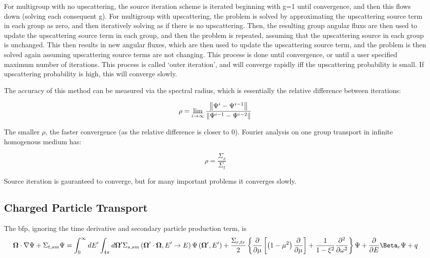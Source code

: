For multigroup with no upscattering, the source iteration scheme is iterated beginning with g=1 until convergence, and then this flows down (solving each consequent g). For multigroup with upscattering, the problem is solved by approximating the upscattering source term in each group as zero, and then iteratively solving as if there is no upscattering. Then, the resulting group angular fluxs are then used to update the upscattering source term in each group, and then the problem is repeated, assuming that the upscattering source in each group is unchanged. This then results in new angular fluxes, which are then used to update the upscattering source term, and the problem is then solved again assuming upscattering source terms are not changing. This process is done until convergence, or until a user specified maximum number of iterations. This process is called `outer iteration', and will converge rapidly iff the upscattering probability is small. If upscattering probability is high, this will converge slowly. 

The accuracy of this method can be measured via the spectral radius, which is essentially the relative difference between iterations:

\begin{equation}
    \rho = \lim_{i\rightarrow\infty}\frac{\left\lVert\Psi^i - \Psi^{i-1}\right\rVert}{\left\lVert\Psi^{i-1} - \Psi^{i-2}\right\rVert}
\end{equation}

The smaller $\rho$, the faster convergence (as the relative difference is closer to 0). Fourier analysis on one group transport in infinite homogenous medium has:

\begin{equation}
    \rho = \frac{\Sigma_s}{\Sigma_t}
\end{equation}

Source iteration is gauranteed to converge, but for many important problems it converges slowly. 

\subsection{Charged Particle Transport}
The \gls{bfp}, ignoring the time derivative and secondary particle production term, is 
\begin{equation}
    \solidangle\cdot\nabla\angularflux + \macroxs{t,sm}\angularflux
    =
    \int_0^{\infty}d\energy'\int_{4\pi}d\solidangle'\macroxs{s,sm}\left(\solidangle'\cdot\solidangle,\energy'\rightarrow\energy\right)\angularflux\left(\solidangle',\energy'\right)
    +\frac{\macroxs{r,tr}}{2}\left\{\frac{\partial}{\partial\mu}\left[\left(1-\mu^2\right)\frac{\partial}{\partial\mu}\right] + \frac{1}{1-\xi^2}\frac{\partial^2}{\partial\omega^2}\right\}\angularflux
    +\frac{\partial}{\partial\energy}\Beta_r\angularflux + q
\end{equation}

